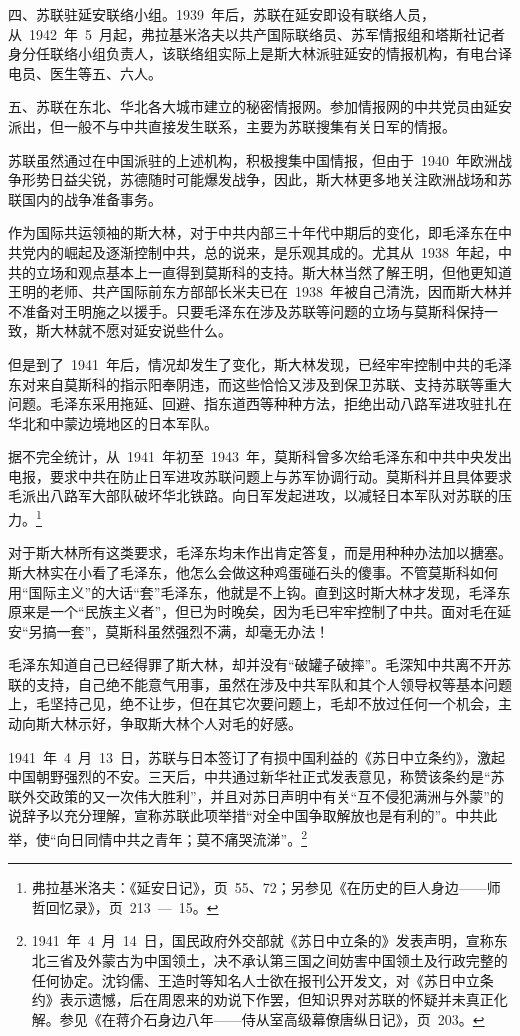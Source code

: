 四、苏联驻延安联络小组。1939~年后，苏联在延安即设有联络人员，从~1942~年~5~月起，弗拉基米洛夫以共产国际联络员、苏军情报组和塔斯社记者身分任联络小组负责人，该联络组实际上是斯大林派驻延安的情报机构，有电台译电员、医生等五、六人。

五、苏联在东北、华北各大城市建立的秘密情报网。参加情报网的中共党员由延安派出，但一般不与中共直接发生联系，主要为苏联搜集有关日军的情报。

苏联虽然通过在中国派驻的上述机构，积极搜集中国情报，但由于~1940~年欧洲战争形势日益尖锐，苏德随时可能爆发战争，因此，斯大林更多地关注欧洲战场和苏联国内的战争准备事务。

作为国际共运领袖的斯大林，对于中共内部三十年代中期后的变化，即毛泽东在中共党内的崛起及逐渐控制中共，总的说来，是乐观其成的。尤其从~1938~年起，中共的立场和观点基本上一直得到莫斯科的支持。斯大林当然了解王明，但他更知道王明的老师、共产国际前东方部部长米夫已在~1938~年被自己清洗，因而斯大林并不准备对王明施之以援手。只要毛泽东在涉及苏联等问题的立场与莫斯科保持一致，斯大林就不愿对延安说些什么。

但是到了~1941~年后，情况却发生了变化，斯大林发现，已经牢牢控制中共的毛泽东对来自莫斯科的指示阳奉阴违，而这些恰恰又涉及到保卫苏联、支持苏联等重大问题。毛泽东采用拖延、回避、指东道西等种种方法，拒绝出动八路军进攻驻扎在华北和中蒙边境地区的日本军队。

据不完全统计，从~1941~年初至~1943~年，莫斯科曾多次给毛泽东和中共中央发出电报，要求中共在防止日军进攻苏联问题上与苏军协调行动。莫斯科并且具体要求毛派出八路军大部队破坏华北铁路。向日军发起进攻，以减轻日本军队对苏联的压力。\footnote{弗拉基米洛夫：《延安日记》，页~55、72；另参见《在历史的巨人身边——师哲回忆录》，页~213~—~15。}

对于斯大林所有这类要求，毛泽东均未作出肯定答复，而是用种种办法加以搪塞。斯大林实在小看了毛泽东，他怎么会做这种鸡蛋碰石头的傻事。不管莫斯科如何用“国际主义”的大话“套”毛泽东，他就是不上钩。直到这时斯大林才发现，毛泽东原来是一个“民族主义者”，但已为时晚矣，因为毛已牢牢控制了中共。面对毛在延安“另搞一套”，莫斯科虽然强烈不满，却毫无办法！

毛泽东知道自己已经得罪了斯大林，却并没有“破罐子破摔”。毛深知中共离不开苏联的支持，自己绝不能意气用事，虽然在涉及中共军队和其个人领导权等基本问题上，毛坚持己见，绝不让步，但在其它次要问题上，毛却不放过任何一个机会，主动向斯大林示好，争取斯大林个人对毛的好感。

1941~年~4~月~13~日，苏联与日本签订了有损中国利益的《苏日中立条约》，激起中国朝野强烈的不安。三天后，中共通过新华社正式发表意见，称赞该条约是“苏联外交政策的又一次伟大胜利”，并且对苏日声明中有关“互不侵犯满洲与外蒙”的说辞予以充分理解，宣称苏联此项举措“对全中国争取解放也是有利的”。中共此举，使“向日同情中共之青年；莫不痛哭流涕”。\footnote{1941~年~4~月~14~日，国民政府外交部就《苏日中立条的》发表声明，宣称东北三省及外蒙古为中国领土，决不承认第三国之间妨害中国领土及行政完整的任何协定。沈钧儒、王造时等知名人士欲在报刊公开发文，对《苏日中立条约》表示遗憾，后在周恩来的劝说下作罢，但知识界对苏联的怀疑并未真正化解。参见《在蒋介石身边八年——侍从室高级幕僚唐纵日记》，页~203。}

